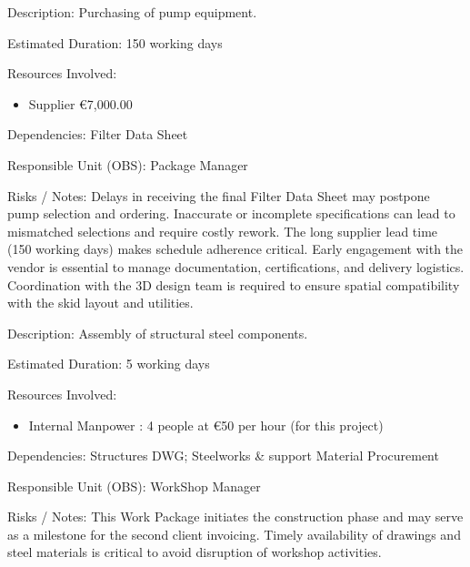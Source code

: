 \begin{tcolorbox}[boxstyle2, title=Pump Procurement]
Description:
Purchasing of pump equipment.

Estimated Duration: 150 working days

Resources Involved:
\begin{itemize}
    \item  Supplier €7,000.00
\end{itemize}

Dependencies:
Filter Data Sheet

Responsible Unit (OBS): Package Manager

Risks / Notes:
Delays in receiving the final Filter Data Sheet may postpone pump selection and ordering.
Inaccurate or incomplete specifications can lead to mismatched selections and require costly rework.
The long supplier lead time (150 working days) makes schedule adherence critical.
Early engagement with the vendor is essential to manage documentation, certifications, and delivery logistics.
Coordination with the 3D design team is required to ensure spatial compatibility with the skid layout and utilities.
\end{tcolorbox}

\begin{tcolorbox}[boxstyle2, title=Structures Prefabrication]
Description:
Assembly of structural steel components.

Estimated Duration: 5 working days

Resources Involved:
\begin{itemize}
    \item  Internal Manpower : 4 people at €50 per hour (for this project)
\end{itemize}

Dependencies:
Structures DWG; Steelworks \& support Material Procurement

Responsible Unit (OBS): WorkShop Manager

Risks / Notes:
This Work Package initiates the construction phase and may serve as a milestone for the second client invoicing. Timely availability of drawings and steel materials is critical to avoid disruption of workshop activities.

\end{tcolorbox}

